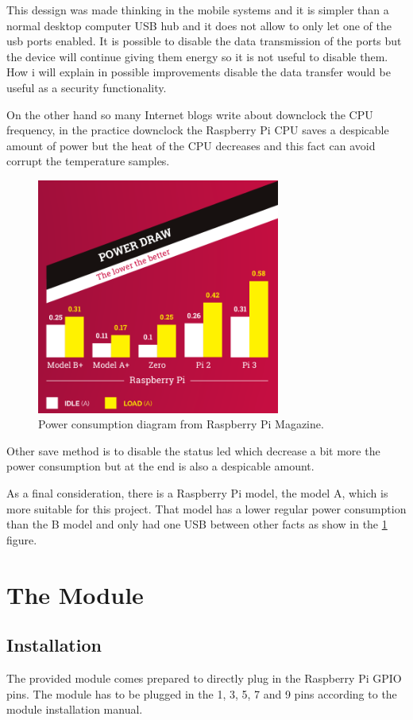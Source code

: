 		This dessign was made thinking in the mobile systems and it is simpler than a normal desktop computer USB hub and it does not allow to only let one of the usb ports enabled. It is possible to disable the data transmission of the ports but the device will continue giving them energy so it is not useful to disable them. How i will explain in possible improvements disable the data transfer would be useful as a security functionality. %

		On the other hand so many Internet blogs write about downclock the CPU frequency, in the practice downclock the Raspberry Pi CPU saves a despicable amount of power but the heat of the CPU decreases and this fact can avoid corrupt the temperature samples.

		\begin{figure}[h!]
		\includegraphics[width=8cm]{fig/powerdraw.png}
		\centering
		\caption{Power consumption diagram from Raspberry Pi Magazine.\label{fig:powerdraw}}
		\end{figure} %

		Other save method is to disable the status led which decrease a bit more the power consumption but at the end is also a despicable amount.

		As a final consideration, there is a Raspberry Pi model, the model A, which is more suitable for this project. That model has a lower regular power consumption than the B model and only had one USB between other facts as show in the \ref{fig:powerdraw} figure.


	\section{The Module}
		\subsection{Installation}
		The provided module comes prepared to directly plug in the Raspberry Pi GPIO pins. The module has to be plugged in the 1, 3, 5, 7 and 9 pins according to the module installation manual. 

